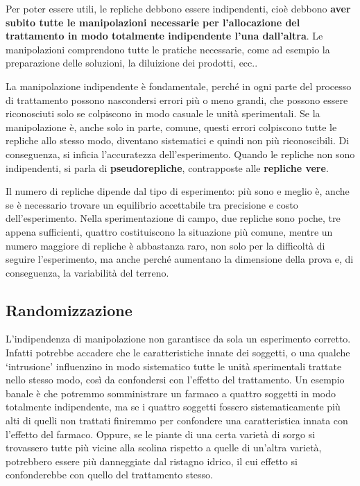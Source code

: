 \documentclass[a4paper,12pt,oneside]{book}
\begin{document}
Per poter essere utili, le repliche debbono essere indipendenti, cioè debbono \textbf{aver subito tutte le manipolazioni necessarie per l'allocazione del trattamento in modo totalmente indipendente l'una dall'altra}. Le manipolazioni comprendono tutte le pratiche necessarie, come ad esempio la preparazione delle soluzioni, la diluizione dei prodotti, ecc..

La manipolazione indipendente è fondamentale, perché in ogni parte del processo di trattamento possono nascondersi errori più o meno grandi, che possono essere riconosciuti solo se colpiscono in modo casuale le unità sperimentali. Se la manipolazione è, anche solo in parte, comune, questi errori colpiscono tutte le repliche allo stesso modo, diventano sistematici e quindi non più riconoscibili. Di conseguenza, si inficia l'accuratezza dell'esperimento. Quando le repliche non sono indipendenti, si parla di \textbf{pseudorepliche}, contrapposte alle \textbf{repliche vere}.

Il numero di repliche dipende dal tipo di esperimento: più sono e meglio è, anche se è necessario trovare un equilibrio accettabile tra precisione e costo dell'esperimento. Nella sperimentazione di campo, due repliche sono poche, tre appena sufficienti, quattro costituiscono la situazione più comune, mentre un numero maggiore di repliche è abbastanza raro, non solo per la difficoltà di seguire l'esperimento, ma anche perché aumentano la dimensione della prova e, di conseguenza, la variabilità del terreno.

\hypertarget{randomizzazione}{%
\subsection{Randomizzazione}\label{randomizzazione}}

L'indipendenza di manipolazione non garantisce da sola un esperimento corretto. Infatti potrebbe accadere che le caratteristiche innate dei soggetti, o una qualche `intrusione' influenzino in modo sistematico tutte le unità sperimentali trattate nello stesso modo, così da confondersi con l'effetto del trattamento. Un esempio banale è che potremmo somministrare un farmaco a quattro soggetti in modo totalmente indipendente, ma se i quattro soggetti fossero sistematicamente più alti di quelli non trattati finiremmo per confondere una caratteristica innata con l'effetto del farmaco. Oppure, se le piante di una certa varietà di sorgo si trovassero tutte più vicine alla scolina rispetto a quelle di un'altra varietà, potrebbero essere più danneggiate dal ristagno idrico, il cui effetto si confonderebbe con quello del trattamento stesso.
\end{document}
